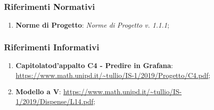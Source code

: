 		\subsubsection{Riferimenti Normativi}
		\begin{enumerate}
			\item \textbf{Norme di Progetto}: \textit{Norme di Progetto v. 1.1.1};	
		\end{enumerate}
	
		\subsubsection{Riferimenti Informativi}
		\begin{enumerate}
		    \item \textbf{Capitolato\glosp d'appalto C4 - Predire in Grafana}: \url{https://www.math.unipd.it/~tullio/IS-1/2019/Progetto/C4.pdf};
		    \item \textbf{Modello a V}: \url{https://www.math.unipd.it/~tullio/IS-1/2019/Dispense/L14.pdf};
		\end{enumerate}
	
	
	

	
	
	
	

